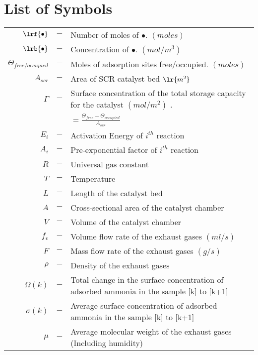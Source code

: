 \section*{List of Symbols}

\begin{table}[H]
    \begin{tabular}{r c l}
        $\lrf{\bullet}$ &$-$& Number of moles of $\bullet$. $(moles)$\\
        $\lrb{\bullet}$ &$-$& Concentration of $\bullet$. $(mol/m^3)$\\
        $\Theta_{free/occupied}$ &$-$& Moles of adsorption sites free/occupied. $(moles)$\\
        $A_{scr}$ &$-$& Area of SCR catalyst bed $\lr{m^2}$ \\
        $\Gamma $ &$-$& Surface concentration of the total storage capacity for the catalyst $(mol/m^2)$ .\\
                  &   & $= \frac{\Theta_{free} + \Theta_{occupied}}{A_{scr}}$ \\
        $E_i$ &$-$& Activation Energy of $i^{th}$ reaction\\
        $A_i$ &$-$& Pre-exponential factor of $i^{th}$ reaction\\
        $R$ &$-$& Universal gas constant\\
        $T$ &$-$& Temperature\\
        $L$ &$-$& Length of the catalyst bed\\
        $A$ &$-$& Cross-sectional area of the catalyst chamber\\
        $V$ &$-$& Volume of the catalyst chamber\\
        $f_v$ &$-$& Volume flow rate of the exhaust gases $(ml/s)$\\
        $F$ &$-$& Mass flow rate of the exhaust gases $(g/s)$\\
        $\rho$ &$-$& Density of the exhaust gases \\
        $\Omega(k)$ &$-$& Total change in the surface concentration of adsorbed ammonia in the sample [k] to [k+1]\\
        $\sigma(k)$ &$-$& Average surface concentration of adsorbed ammonia in the sample [k] to [k+1]\\
        $\mu$ &$-$& Average molecular weight of the exhaust gases (Including humidity)\\
    \end{tabular}
\end{table}
